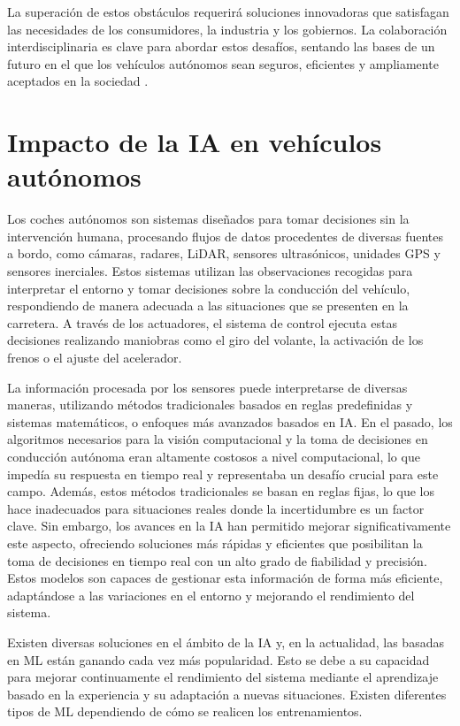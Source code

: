 La superación de estos obstáculos requerirá soluciones innovadoras que satisfagan las necesidades de los consumidores, la industria y los gobiernos. La colaboración interdisciplinaria es clave para abordar estos desafíos, sentando las bases de un futuro en el que los vehículos autónomos sean seguros, eficientes y ampliamente aceptados en la sociedad \cite{challenges-autonomous}.

\section{Impacto de la IA en vehículos autónomos}
\label{sec:ia-intro}

Los coches autónomos son sistemas diseñados para tomar decisiones sin la intervención humana, procesando flujos de datos procedentes de diversas fuentes a bordo, como cámaras, radares, \ac{LiDAR}, sensores ultrasónicos, unidades \ac{GPS} y sensores inerciales. Estos sistemas utilizan las observaciones recogidas para interpretar el entorno y tomar decisiones sobre la conducción del vehículo, respondiendo de manera adecuada a las situaciones que se presenten en la carretera. A través de los actuadores, el sistema de control ejecuta estas decisiones realizando maniobras como el giro del volante, la activación de los frenos o el ajuste del acelerador.

La información procesada por los sensores puede interpretarse de diversas maneras, utilizando métodos tradicionales basados en reglas predefinidas y sistemas matemáticos, o enfoques más avanzados basados en \ac{IA}. En el pasado, los algoritmos necesarios para la visión computacional y la toma de decisiones en conducción autónoma eran altamente costosos a nivel computacional, lo que impedía su respuesta en tiempo real y representaba un desafío crucial para este campo. Además, estos métodos tradicionales se basan en reglas fijas, lo que los hace inadecuados para situaciones reales donde la incertidumbre es un factor clave. Sin embargo, los avances en la \ac{IA} han permitido mejorar significativamente este aspecto, ofreciendo soluciones más rápidas y eficientes que posibilitan la toma de decisiones en tiempo real con un alto grado de fiabilidad y precisión. Estos modelos son capaces de gestionar esta información de forma más eficiente, adaptándose a las variaciones en el entorno y mejorando el rendimiento del sistema.

Existen diversas soluciones en el ámbito de la \ac{IA} y, en la actualidad, las basadas en \ac{ML} están ganando cada vez más popularidad. Esto se debe a su capacidad para mejorar continuamente el rendimiento del sistema mediante el aprendizaje basado en la experiencia y su adaptación a nuevas situaciones. Existen diferentes tipos de \ac{ML} dependiendo de cómo se realicen los entrenamientos.

